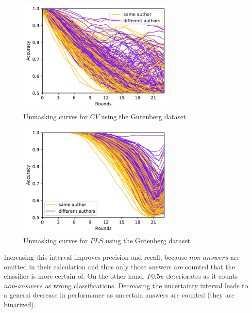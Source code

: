 \begin{figure}
  \centering
  \includegraphics[width=0.7\textwidth]{figures/cv_curves}
  \caption{Unmasking curves for $CV$ using the Gutenberg dataset}
  \label{fig:cv_curves}
\end{figure}
\begin{figure}
  \centering
  \includegraphics[width=0.7\textwidth]{figures/pls_curves}
  \caption{Unmasking curves for $PLS$ using the Gutenberg dataset}
  \label{fig:pls_curves}
\end{figure}



Increasing this interval improves precision and recall, because $non$-$answers$ are omitted in their calculation and thus only those answers are counted that the classifier is more certain of.
On the other hand, $F0.5u$ deteriorates as it counts $non$-$answers$ as wrong classifications.
Decreasing the uncertainty interval leads to a general decrease in performance as uncertain answers are counted  (they are binarized).

